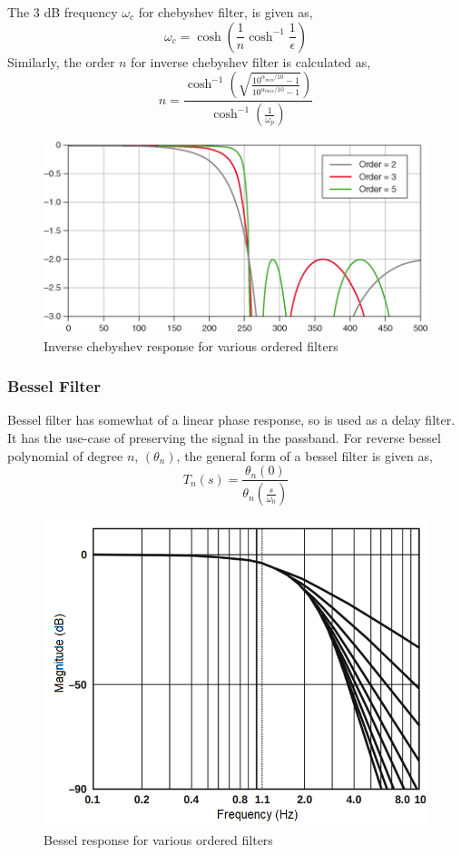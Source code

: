 \documentclass{lab_sheet}
\begin{document}
The 3 dB frequency $\omega_c$ for chebyshev filter, is given as,
\begin{equation}
   \omega_c=\cosh\left(\frac{1}{n}\cosh^{-1}\frac{1}{\epsilon}\right)
\end{equation}
Similarly, the order $n$ for inverse chebyshev filter is calculated as,
\begin{equation}
   n=\frac{\cosh^{-1}\left(\sqrt{\frac{10^{\alpha_{min}/10}-1}{10^{\alpha_{max}/10}-1}}\right)}{\cosh^{-1}(\frac{1}{\omega_p})}
\end{equation}

\begin{figure}[H]
   \centering
   \includegraphics[width=0.8\linewidth]{../Figures/inverse.png}
   \caption{Inverse chebyshev response for various ordered filters}
        \label{fig:inverse}
\end{figure}
\subsubsection{Bessel Filter}
Bessel filter has somewhat of a linear phase response, so is used as a delay filter. It has the use-case of preserving the signal in the passband. For reverse bessel polynomial of degree $n$, $(\theta_n)$, the general form of a bessel filter is given as,
\begin{equation}
   T_n(s)=\frac{\theta_n(0)}{\theta_n(\frac{s}{\omega_0})}
\end{equation}

\begin{figure}[H]
   \centering
   \includegraphics[width=0.5\linewidth]{../Figures/bessel.png}
   \caption{Bessel response for various ordered filters}
        \label{fig:bessel}
\end{figure}
\end{document}
